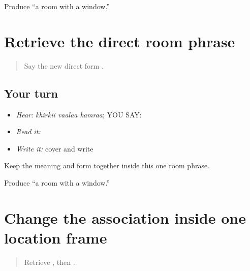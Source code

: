 \begin{tcolorbox}[breakable,colback=teal!4,colframe=teal!35!black,title={Before you move on}]
Produce “a room with a window.”
\end{tcolorbox}
\section[\texorpdfstring{\pa{ਖਿੜਕੀ} \pa{ਵਾਲਾ} \pa{ਕਮਰਾ} (khirkii vaalaa kamraa)}{ਖਿੜਕੀ ਵਾਲਾ ਕਮਰਾ (khirkii vaalaa kamraa)}]{Retrieve the direct room phrase}

\label{lesson:PA-C195-vala-review}



\begin{quote}
Say the new direct form \textbf{}.
\end{quote}

\subsection*{Your turn}
\begin{itemize}
\raggedright
  \item \emph{Hear:} \emph{khirkii vaalaa kamraa}; YOU SAY: \textbf{  }
  \item \emph{Read it:} \textbf{  }
  \item \emph{Write it:} cover and write \textbf{}
\end{itemize}

\begin{grammarlens}[title={Grammar Lens}]
Keep the meaning and form together inside this one room phrase.
\end{grammarlens}

\begin{tcolorbox}[breakable,colback=teal!4,colframe=teal!35!black,title={Before you move on}]
Produce “a room with a window.”
\end{tcolorbox}
\section[\texorpdfstring{\pa{ਖਿੜਕੀ} \pa{ਵਾਲੇ} \pa{ਕਮਰੇ} \pa{ਵਿੱਚ} (khirkii vaale …)}{ਖਿੜਕੀ ਵਾਲੇ ਕਮਰੇ ਵਿੱਚ (khirkii vaale …)}]{Change the association inside one location frame}

\label{lesson:PA-C195-vale}



\begin{quote}
Retrieve \textbf{  }, then \textbf{ }.
\end{quote}

